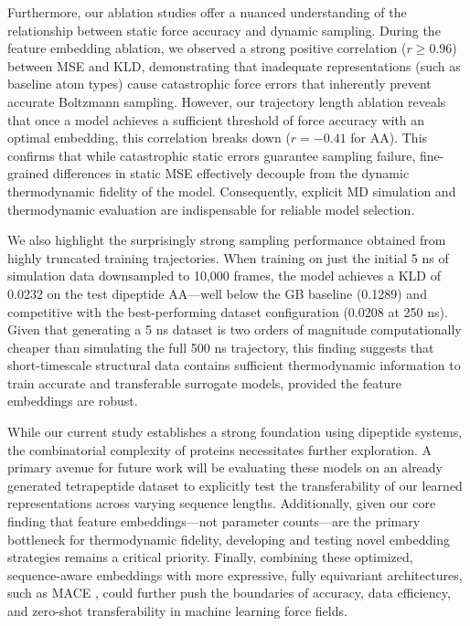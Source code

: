 Furthermore, our ablation studies offer a nuanced understanding of the relationship between static force accuracy and dynamic sampling. During the feature embedding ablation, we observed a strong positive correlation ($r \ge 0.96$) between MSE and KLD, demonstrating that inadequate representations (such as baseline atom types) cause catastrophic force errors that inherently prevent accurate Boltzmann sampling. However, our trajectory length ablation reveals that once a model achieves a sufficient threshold of force accuracy with an optimal embedding, this correlation breaks down ($r = -0.41$ for AA). This confirms that while catastrophic static errors guarantee sampling failure, fine-grained differences in static MSE effectively decouple from the dynamic thermodynamic fidelity of the model. Consequently, explicit MD simulation and thermodynamic evaluation are indispensable for reliable model selection.

We also highlight the surprisingly strong sampling performance obtained from highly truncated training trajectories. When training on just the initial 5 ns of simulation data downsampled to 10{,}000 frames, the model achieves a KLD of 0.0232 on the test dipeptide AA---well below the GB baseline (0.1289) and competitive with the best-performing dataset configuration (0.0208 at 250 ns). Given that generating a 5 ns dataset is two orders of magnitude computationally cheaper than simulating the full 500 ns trajectory, this finding suggests that short-timescale structural data contains sufficient thermodynamic information to train accurate and transferable surrogate models, provided the feature embeddings are robust.

While our current study establishes a strong foundation using dipeptide systems, the combinatorial complexity of proteins necessitates further exploration. A primary avenue for future work will be evaluating these models on an already generated tetrapeptide dataset to explicitly test the transferability of our learned representations across varying sequence lengths. Additionally, given our core finding that feature embeddings---not parameter counts---are the primary bottleneck for thermodynamic fidelity, developing and testing novel embedding strategies remains a critical priority. Finally, combining these optimized, sequence-aware embeddings with more expressive, fully equivariant architectures, such as MACE \citep{batatia_mace_2022}, could further push the boundaries of accuracy, data efficiency, and zero-shot transferability in machine learning force fields.